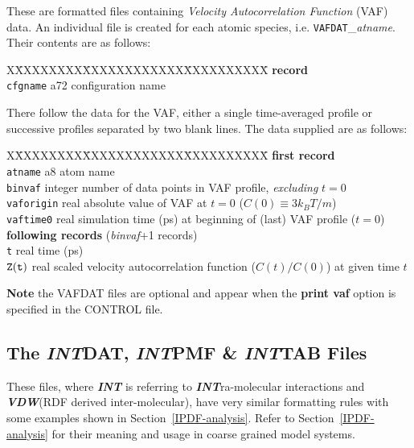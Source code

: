 These are formatted files containing {\em Velocity Autocorrelation
Function} (VAF) data.  An individual file is created for each atomic
species, i.e. {\tt VAFDAT}\_{\em atname}. Their contents are as follows:
\begin{tabbing}
X\=XXXXXXXX\=XXXXXXXXXXXX\=XXXXXXXXXX\=\kill
{\bf record} \\
\> {\tt cfgname} \> a72    \> configuration name \\
\end{tabbing}
There follow the data for the VAF, either a single time-averaged
profile or successive profiles separated by two blank lines.
The data supplied are as follows:
\begin{tabbing}
X\=XXXXXXXX\=XXXXXXXXXXXX\=XXXXXXXXXX\=\kill
{\bf first record} \\
\> {\tt atname}    \> a8      \> atom name \\
\> {\tt binvaf}    \> integer \> number of data points in VAF profile, {\em excluding} $t=0$ \\
\> {\tt vaforigin} \> real    \> absolute value of VAF at $t=0$ ($C(0) \equiv 3k_B T/m$) \\
\> {\tt vaftime0}  \> real    \> simulation time (ps) at beginning of (last) VAF profile ($t=0$) \\
{\bf following records} ({\em binvaf}+1 records) \\
\> {\tt t}         \> real    \> time (ps) \\
\> $\tt Z(t)$      \> real    \> scaled velocity autocorrelation function ($C(t)/C(0)$) at given time $t$
\end{tabbing}

{\bf Note} the VAFDAT files are optional and appear when the
{\bf print vaf} option is specified in the CONTROL file.

\subsection{The \textrm{\textit{\textbf{INT}}}DAT,
\textrm{\textit{\textbf{INT}}}PMF \& \textrm{\textit{\textbf{INT}}}TAB Files}
\label{bonded-files}

These files, where \textrm{\textit{\textbf{INT}}} is referring
to \textrm{\textit{\textbf{INT}}}ra-molecular interactions and
\textrm{\textit{\textbf{VDW}}}(RDF derived inter-molecular),
have very similar formatting rules with some examples shown in
Section~\ref{IPDF-analysis}.  Refer to Section~\ref{IPDF-analysis}
for their meaning and usage in coarse grained model systems.

